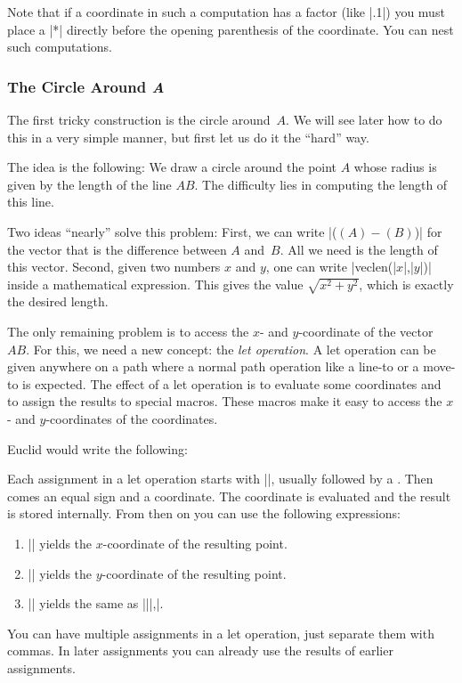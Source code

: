 Note that if a coordinate in such a computation has a factor (like
|.1|) you must place a |*| directly before the opening parenthesis of
the coordinate. You can nest such computations.



\subsubsection{The Circle Around \emph{A}}

The first tricky construction is the circle around~$A$. We will see
later how to do this in a very simple manner, but first let us do it
the ``hard'' way.

The idea is the following: We draw a circle around the point $A$ whose
radius is given by the length of the line $AB$. The difficulty lies in
computing the length of this line.

Two ideas ``nearly'' solve this problem: First, we can write
|($ (A) - (B) $)| for the vector that is the difference between $A$
and~$B$. All we need is the length of this vector. Second, given two
numbers $x$ and $y$, one can write |veclen(|$x$|,|$y$|)| inside a
mathematical expression. This gives the value $\sqrt{x^2+y^2}$, which
is exactly the desired length.

The only remaining problem is to access the $x$- and $y$-coordinate of
the vector~$AB$. For this, we need a new concept: the \emph{let
  operation}. A let operation can be given anywhere on a path where a
normal path operation like a line-to or a move-to is expected. The
effect of a let operation is to evaluate some coordinates and to
assign the results to special macros. These macros make it easy to
access the $x$- and $y$-coordinates of the coordinates.

Euclid would write the following:
\begin{codeexample}[]
\end{codeexample}

Each assignment in a let operation starts with |\p|, usually followed
by a . Then comes an equal sign and a coordinate. The
coordinate is evaluated and the result is stored internally. From
then on you can use the following expressions: 
\begin{enumerate}
\item |\x| yields the $x$-coordinate of the resulting point.
\item |\y| yields the $y$-coordinate of the resulting
  point.
\item |\p| yields the same as |\x||,\y|.
\end{enumerate}
You can have multiple assignments in a let operation, just separate
them with commas. In later assignments you can already use the results
of earlier assignments.

